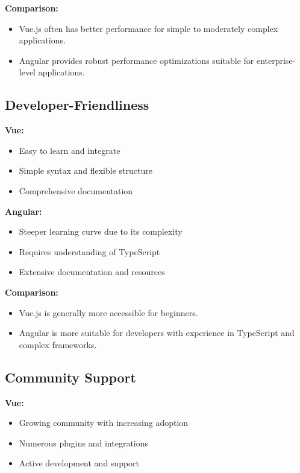 \textbf{Comparison:}
\begin{itemize}
    \item Vue.js often has better performance for simple to moderately complex applications.
    \item Angular provides robust performance optimizations suitable for enterprise-level applications.
\end{itemize}

\subsection{Developer-Friendliness}

\textbf{Vue:}
\begin{itemize}
    \item Easy to learn and integrate
    \item Simple syntax and flexible structure
    \item Comprehensive documentation
\end{itemize}

\textbf{Angular:}
\begin{itemize}
    \item Steeper learning curve due to its complexity
    \item Requires understanding of TypeScript
    \item Extensive documentation and resources
\end{itemize}

\textbf{Comparison:}
\begin{itemize}
    \item Vue.js is generally more accessible for beginners.
    \item Angular is more suitable for developers with experience in TypeScript and complex frameworks.
\end{itemize}

\subsection{Community Support}

\textbf{Vue:}
\begin{itemize}
    \item Growing community with increasing adoption
    \item Numerous plugins and integrations
    \item Active development and support
\end{itemize}


